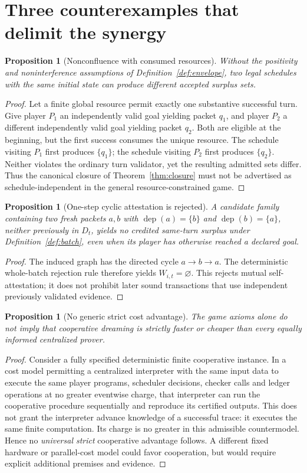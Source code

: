 \documentclass[11pt,letterpaper]{article}
\newtheorem{proposition}[theorem]{Proposition}
\newcommand{\dep}{\operatorname{dep}}
\begin{document}
\section{Three counterexamples that delimit the synergy}\label{gl-first-W1-s9}
\begin{proposition}[Nonconfluence with consumed resources]\label{prop:nonconfluence}
Without the positivity and noninterference assumptions of Definition~\ref{def:envelope}, two legal schedules with the same initial state can produce different accepted surplus sets.
\end{proposition}
\begin{proof}
Let a finite global resource permit exactly one substantive successful turn. Give player $P_1$ an independently valid goal yielding packet $q_1$, and player $P_2$ a different independently valid goal yielding packet $q_2$. Both are eligible at the beginning, but the first success consumes the unique resource. The schedule visiting $P_1$ first produces $\{q_1\}$; the schedule visiting $P_2$ first produces $\{q_2\}$. Neither violates the ordinary turn validator, yet the resulting admitted sets differ. Thus the canonical closure of Theorem~\ref{thm:closure} must not be advertised as schedule-independent in the general resource-constrained game.
\end{proof}
\begin{proposition}[One-step cyclic attestation is rejected]\label{prop:cycle}
A candidate family containing two fresh packets $a,b$ with $\dep(a)=\{b\}$ and $\dep(b)=\{a\}$, neither previously in $D_t$, yields no credited same-turn surplus under Definition~\ref{def:batch}, even when its player has otherwise reached a declared goal.
\end{proposition}
\begin{proof}
The induced graph has the directed cycle $a\to b\to a$. The deterministic whole-batch rejection rule therefore yields $W_{i,t}=\varnothing$. This rejects mutual self-attestation; it does not prohibit later sound transactions that use independent previously validated evidence.
\end{proof}
\begin{proposition}[No generic strict cost advantage]\label{prop:nospeed}
The game axioms alone do not imply that cooperative dreaming is strictly faster or cheaper than every equally informed centralized prover.
\end{proposition}
\begin{proof}
Consider a fully specified deterministic finite cooperative instance. In a cost model permitting a centralized interpreter with the same input data to execute the same player programs, scheduler decisions, checker calls and ledger operations at no greater eventwise charge, that interpreter can run the cooperative procedure sequentially and reproduce its certified outputs. This does not grant the interpreter advance knowledge of a successful trace: it executes the same finite computation. Its charge is no greater in this admissible countermodel. Hence no \emph{universal strict} cooperative advantage follows. A different fixed hardware or parallel-cost model could favor cooperation, but would require explicit additional premises and evidence.
\end{proof}
\end{document}
